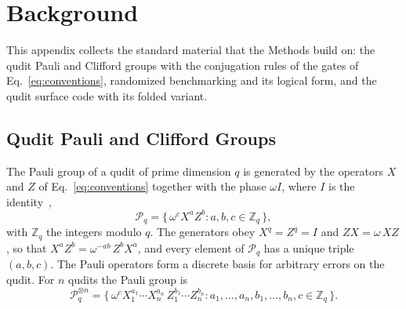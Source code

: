 \section{Background}
\label{app:background}\label{sec:bg}

This appendix collects the standard material that the Methods build on: the qudit Pauli and Clifford groups with the conjugation rules of the gates of Eq.~\eqref{eq:conventions}, randomized benchmarking and its logical form, and the qudit surface code with its folded variant.

\subsection{Qudit Pauli and Clifford Groups}
\label{app:background-groups}

The Pauli group of a qudit of prime dimension $q$ is generated by the operators $X$ and $Z$ of Eq.~\eqref{eq:conventions} together with the phase $\omega I$, where $I$ is the identity~\cite{Gottesman1999,Hostens2005,Wang2020,SarkarYoder2024},
\begin{equation}
  \mathcal{P}_q = \bigl\{\, \omega^c X^a Z^b : a, b, c \in \mathbb{Z}_q \,\bigr\},
\end{equation}
with $\mathbb{Z}_q$ the integers modulo $q$. The generators obey $X^q = Z^q = I$ and $Z X = \omega\, X Z$, so that $X^a Z^b = \omega^{-ab}\, Z^b X^a$, and every element of $\mathcal{P}_q$ has a unique triple $(a, b, c)$. The Pauli operators form a discrete basis for arbitrary errors on the qudit. For $n$ qudits the Pauli group is
\begin{equation}
  \mathcal{P}_q^{\otimes n}
  = \bigl\{\, \omega^c
      X_1^{a_1} \cdots X_n^{a_n}\,
      Z_1^{b_1} \cdots Z_n^{b_n}
      : a_1, \dots, a_n, b_1, \dots, b_n, c \in \mathbb{Z}_q
     \,\bigr\}.
\end{equation}

